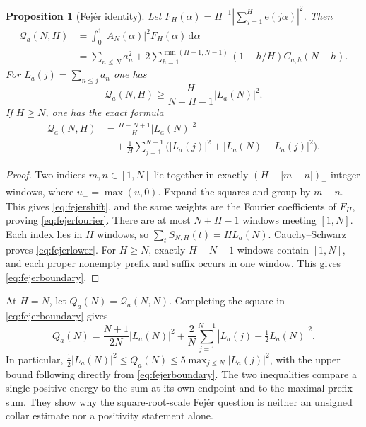 \documentclass[11pt]{amsart}
\newtheorem{proposition}[theorem]{Proposition}
\theoremstyle{definition}
\theoremstyle{remark}
\newcommand{\Q}{\mathcal Q}
\newcommand{\ee}{\mathrm e}
\newcommand{\dd}{\,\mathrm d}
\numberwithin{equation}{section}
\begin{document}
\begin{proposition}[Fej\'er identity]\label{prop:fejer}
Let
\(F_H(\alpha)=H^{-1}|\sum_{j=1}^H\ee(j\alpha)|^2\).
Then
\begin{align}
 \Q_a(N,H)
 &=\int_0^1 |A_N(\alpha)|^2F_H(\alpha)\dd\alpha \label{eq:fejerfourier}\\
 &=\sum_{n\le N}a_n^2+
  2\sum_{h=1}^{\min(H-1,N-1)}(1-h/H) C_{a,h}(N-h).\label{eq:fejershift}
\end{align}
For \(L_a(j)=\sum_{n\le j}a_n\) one has
\begin{equation}\label{eq:fejerlower}
 \Q_a(N,H)\ge\frac{H}{N+H-1}|L_a(N)|^2 .
\end{equation}
If \(H\ge N\), one has the exact formula
\begin{align}
 \Q_a(N,H)
 &=\frac{H-N+1}{H}|L_a(N)|^2\nonumber\\
 &\quad+\frac1H\sum_{j=1}^{N-1}
  \bigl(|L_a(j)|^2+|L_a(N)-L_a(j)|^2\bigr). \label{eq:fejerboundary}
\end{align}
\end{proposition}
\begin{proof}
Two indices \(m,n\in[1,N]\) lie together in exactly \((H-|m-n|)_+\) integer windows, where \(u_+=\max(u,0)\). Expand the squares and group by \(m-n\). This gives \eqref{eq:fejershift}, and the same weights are the Fourier coefficients of \(F_H\), proving \eqref{eq:fejerfourier}. There are at most \(N+H-1\) windows meeting \([1,N]\). Each index lies in \(H\) windows, so \(\sum_t S_{N,H}(t)=H L_a(N)\). Cauchy--Schwarz proves \eqref{eq:fejerlower}. For \(H\ge N\), exactly \(H-N+1\) windows contain \([1,N]\), and each proper nonempty prefix and suffix occurs in one window. This gives \eqref{eq:fejerboundary}.
\end{proof}

At \(H=N\), let \(Q_a(N)=\Q_a(N,N)\). Completing the square in \eqref{eq:fejerboundary} gives
\begin{equation}\label{eq:completion}
 Q_a(N)=\frac{N+1}{2N}|L_a(N)|^2+
 \frac2N\sum_{j=1}^{N-1}|L_a(j)-\tfrac12 L_a(N)|^2.
\end{equation}
In particular, \(\tfrac12|L_a(N)|^2\le Q_a(N)\le
5\max_{j\le N}|L_a(j)|^2\), with the upper bound following directly from \eqref{eq:fejerboundary}. The two inequalities compare a single positive energy to the sum at its own endpoint and to the maximal prefix sum. They show why the square-root-scale Fej\'er question is neither an unsigned collar estimate nor a positivity statement alone.
\end{document}
